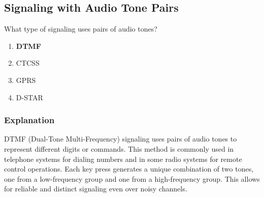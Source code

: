 \subsection{Signaling with Audio Tone Pairs}\label{T2B06}

\begin{tcolorbox}[colback=gray!10!white,colframe=black!75!black,title=T2B06]
What type of signaling uses pairs of audio tones?
\begin{enumerate}[noitemsep]
    \item \textbf{DTMF}
    \item CTCSS
    \item GPRS
    \item D-STAR
\end{enumerate}
\end{tcolorbox}

\subsubsection*{Explanation}
DTMF (Dual-Tone Multi-Frequency) signaling uses pairs of audio tones to represent different digits or commands. This method is commonly used in telephone systems for dialing numbers and in some radio systems for remote control operations. Each key press generates a unique combination of two tones, one from a low-frequency group and one from a high-frequency group. This allows for reliable and distinct signaling even over noisy channels.